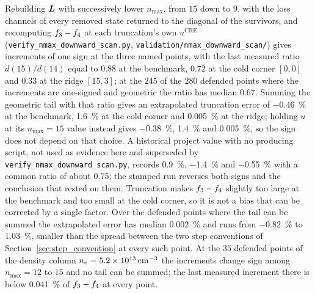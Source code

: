 Rebuilding $\bm{L}$ with successively lower $n_{\max}$, from $15$ down to $9$,
with the loss channels of every removed state returned to the diagonal of the
survivors, and recomputing $f_{3}-f_{4}$ at each truncation's own
$u^{\mathrm{CRE}}$ (\texttt{verify\_nmax\_downward\_scan.py},
\texttt{validation/nmax\_downward\_scan/}) gives increments of one sign at the
three named points, with the last measured ratio $d(15)/d(14)$ equal to
$0.88$ at the benchmark, $0.72$ at the cold corner $[0,0]$ and $0.33$ at the
ridge $[15,3]$; at the $245$ of the $280$ defended points where the increments
are one-signed and geometric the ratio has median $0.67$. Summing the geometric
tail with that ratio gives an extrapolated truncation error of
\SI{-0.46}{\percent} at the benchmark, \SI{+1.6}{\percent} at the cold corner
and \SI{+0.005}{\percent} at the ridge; holding $u$ at its $n_{\max}=15$ value
instead gives \SI{-0.38}{\percent}, \SI{+1.4}{\percent} and
\SI{+0.005}{\percent}, so the sign does not depend on that choice. A historical
project value with no producing script, not used as evidence here and superseded
by \texttt{verify\_nmax\_downward\_scan.py}, records
\SI{+0.9}{\percent}, \SI{-1.4}{\percent} and \SI{-0.55}{\percent} with a
common ratio of about $0.75$; the stamped run reverses both signs and the
conclusion that rested on them. Truncation makes
$f_{3}-f_{4}$ slightly too large at the benchmark and too small at the
cold corner, so it is not a bias that can be corrected by a single factor.
Over the defended points where the tail can be summed the extrapolated error
has median \SI{+0.002}{\percent} and runs from \SI{-0.82}{\percent} to
\SI{+1.03}{\percent}, smaller than the spread between the two step conventions
of Section~\ref{sec:step_convention} at every such point. At the $35$ defended
points of the density column $n_e = \SI{5.2e13}{\per\cubic\centi\metre}$ the
increments change sign among $n_{\max} = 12$ to $15$ and no tail can be
summed; the last measured increment there is below \SI{0.041}{\percent} of
$f_{3}-f_{4}$ at every point.

